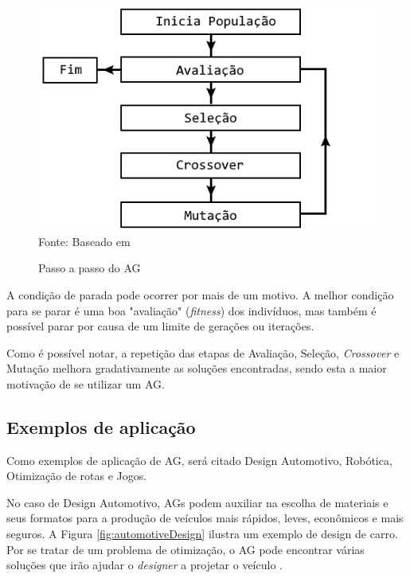 \documentclass[
	12pt,					%
	openright,				%
	oneside,				%
	a4paper,				%
	bibjustif,				%
	chapter=TITLE,			%
	english,				%
	brazil,					%
	]{abntex2}
\newcommand{\source}[1]{\small Fonte: {#1}}
\begin{document}
	\begin{figure}[ht!]
		\centering
		\caption{Passo a passo do AG}
		\includegraphics[scale=0.7]{img/GeneticAlgorithmFlow.png}\\
		\vspace{0.5mm}
		\source{Baseado em }
		\label{fig:gaflow}
	\end{figure}
	
	A condição de parada pode ocorrer por mais de um motivo.
	A melhor condição para se parar é uma boa "avaliação"{} (\textit{fitness}) dos indivíduos,
	mas também é possível parar por causa de um limite de gerações ou iterações.
	
	Como é possível notar,
	a repetição das etapas de Avaliação, Seleção, \textit{Crossover} e Mutação melhora gradativamente as soluções encontradas,
	sendo esta a maior motivação de se utilizar um AG.	
	
	\FloatBarrier
	\subsection{Exemplos de aplicação}
	Como exemplos de aplicação de AG,
	será citado
	Design Automotivo, Robótica, Otimização de rotas e Jogos.
	
	No caso de Design Automotivo,
	AGs podem auxiliar na escolha de materiais e seus formatos para a produção de veículos mais rápidos, leves, econômicos e mais seguros.
	A Figura \ref{fig:automotiveDesign} ilustra um exemplo de design de carro.
	Por se tratar de um problema de otimização,
	o AG pode encontrar várias soluções que irão ajudar o \textit{designer} a projetar o veículo
	\cite{brainz}.
	
\end{document}
